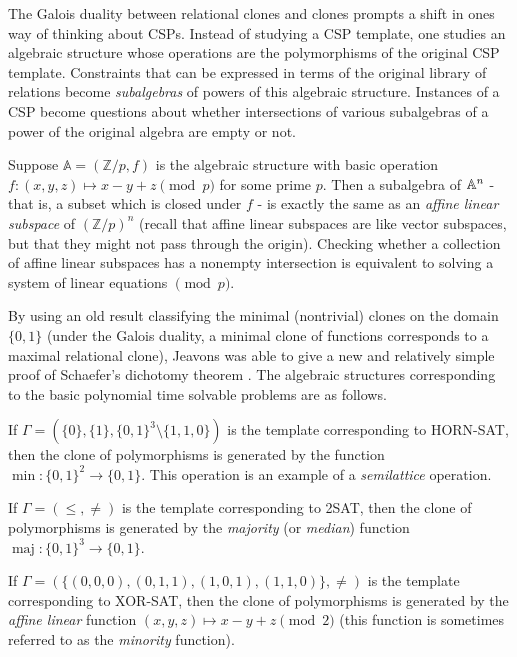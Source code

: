\documentclass[letterpaper,11pt]{article}
\begin{document}
The Galois duality between relational clones and clones prompts a shift in ones way of thinking about CSPs. Instead of studying a CSP template, one studies an algebraic structure whose operations are the polymorphisms of the original CSP template. Constraints that can be expressed in terms of the original library of relations become \emph{subalgebras} of powers of this algebraic structure. Instances of a CSP become questions about whether intersections of various subalgebras of a power of the original algebra are empty or not.

\begin{ex} Suppose $\mathbb{A} = (\mathbb{Z}/p, f)$ is the algebraic structure with basic operation $f : (x,y,z) \mapsto x - y + z \pmod{p}$ for some prime $p$. Then a subalgebra of $\mathbb{A}^n$ - that is, a subset which is closed under $f$ - is exactly the same as an \emph{affine linear subspace} of $(\mathbb{Z}/p)^n$ (recall that affine linear subspaces are like vector subspaces, but that they might not pass through the origin). Checking whether a collection of affine linear subspaces has a nonempty intersection is equivalent to solving a system of linear equations $\pmod{p}$.
\end{ex}

By using an old result classifying the minimal (nontrivial) clones on the domain $\{0,1\}$ (under the Galois duality, a minimal clone of functions corresponds to a maximal relational clone), Jeavons \cite{jeavons} was able to give a new and relatively simple proof of Schaefer's dichotomy theorem \cite{schaefer}. The algebraic structures corresponding to the basic polynomial time solvable problems are as follows.

\begin{ex} If $\Gamma = (\{0\}, \{1\}, \{0,1\}^3\setminus \{1,1,0\})$ is the template corresponding to HORN-SAT, then the clone of polymorphisms is generated by the function $\min : \{0,1\}^2 \rightarrow \{0,1\}$. This operation is an example of a \emph{semilattice} operation.
\end{ex}

\begin{ex} If $\Gamma = (\le, \ne)$ is the template corresponding to 2SAT, then the clone of polymorphisms is generated by the \emph{majority} (or \emph{median}) function $\operatorname{maj} : \{0,1\}^3 \rightarrow \{0,1\}$.
\end{ex}

\begin{ex} If $\Gamma = (\{(0,0,0), (0,1,1), (1,0,1), (1,1,0)\}, \ne)$ is the template corresponding to XOR-SAT, then the clone of polymorphisms is generated by the \emph{affine linear} function $(x,y,z) \mapsto x-y+z \pmod{2}$ (this function is sometimes referred to as the \emph{minority} function).
\end{ex}
\end{document}
